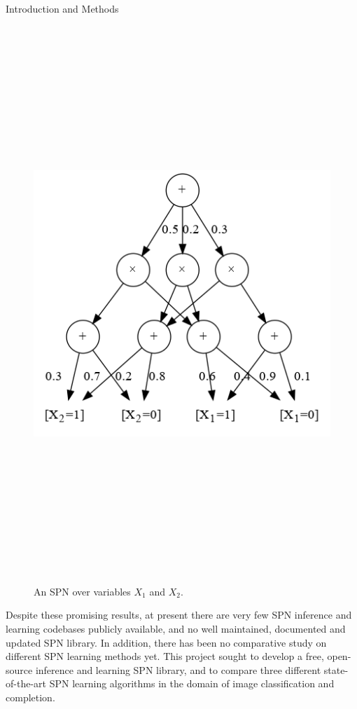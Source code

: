 \documentclass[final,hyperref={pdfpagelabels=false},notheorems]{beamer}
\theoremstyle{thesisstyle}
\newcommand{\pskip}{\vskip 0.5cm}
\begin{document}
\begin{frame}[t]
\begin{columns}[t]
\begin{column}{.5225\textwidth}
\begin{block}{Introduction and Methods}
      \begin{figure}[h]
        \centering\includegraphics[height=21cm]{graphs/sample_spn.png}
        \caption{An SPN over variables $X_1$ and $X_2$.}
      \end{figure}

      Despite these promising results, at present there are very few SPN inference and learning
      codebases publicly available, and no well maintained, documented and updated SPN library. In
      addition, there has been no comparative study on different SPN learning methods yet. This
      project sought to develop a free, open-source inference and learning SPN library, and to
      compare three different state-of-the-art SPN learning algorithms in the domain of image
      classification and completion.\pskip


\end{block}
\end{column}
\end{columns}
\end{frame}
\end{document}
